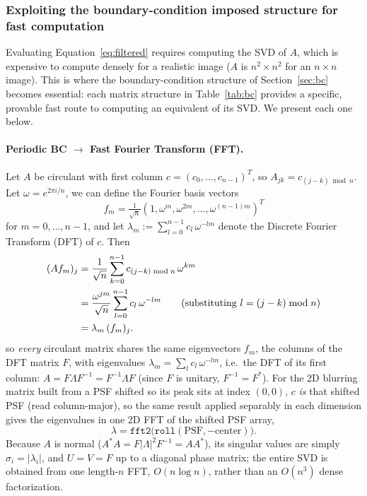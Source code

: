 \documentclass[12pt, a4paper, onecolumn]{article}
\theoremstyle{plain}          %
\theoremstyle{definition}     %
\theoremstyle{remark}
\begin{document}
\subsubsection{Exploiting the boundary-condition imposed structure for fast computation}
\label{sec:classical-fast}
Evaluating Equation~\eqref{eq:filtered} requires computing the SVD of $A$, which is expensive to compute densely for a realistic image ($A$ is
$n^2\times n^2$ for an $n\times n$ image). This is where the
boundary-condition structure of Section~\ref{sec:bc} becomes essential:
each matrix structure in Table~\ref{tab:bc} provides a specific, provable
fast route to computing an equivalent of its SVD. We present each one below.
 
\paragraph{Periodic BC $\to$ Fast Fourier Transform (FFT).} Let $A$ be circulant with first column
$c=(c_0,\dots,c_{n-1})^T$, so $A_{jk}=c_{(j-k)\bmod n}$. Let
$\omega=e^{2\pi i/n}$, we can define the Fourier basis vectors
$$f_m = \tfrac{1}{\sqrt n}(1,\omega^m,\omega^{2m},\dots,\omega^{(n-1)m})^T$$
for $m=0,\dots,n-1$, and let $\lambda_m := \sum_{l=0}^{n-1} c_l\,\omega^{-lm}$
denote the Discrete Fourier Transform (DFT) of $c$. Then
\begin{align}
    (Af_m)_j &= \frac{1}{\sqrt n}\sum_{k=0}^{n-1} c_{(j-k)\bmod n}\,\omega^{km} \notag\\
    &= \frac{\omega^{jm}}{\sqrt n}\sum_{l=0}^{n-1} c_l\,\omega^{-lm}
    \qquad\text{(substituting $l=(j-k)\bmod n$)} \notag\\
    &= \lambda_m\,(f_m)_j.
    \label{eq:circ-proof}
\end{align}
so \emph{every} circulant matrix shares the same eigenvectors $f_m$, the columns of the DFT matrix $F$, with eigenvalues
$\lambda_m=\sum_l c_l\,\omega^{-lm}$, i.e.\ the DFT of its first column:
$A=F\Lambda F^{-1}=F^{-1}\Lambda F$ (since $F$ is unitary, $F^{-1}=F^*$).
For the 2D blurring matrix built from a PSF shifted so its peak sits at
index $(0,0)$, $c$ \emph{is} that shifted PSF (read column-major), so the
same result applied separably in each dimension gives the eigenvalues in
one 2D FFT of the shifted PSF array,
\begin{equation}
    \lambda = \texttt{fft2}\big(\texttt{roll}(\text{PSF},-\text{center})\big).
    \label{eq:fft-eig}
\end{equation}
Because $A$ is normal ($A^*A=F|\Lambda|^2F^{-1}=AA^*$), its singular
values are simply $\sigma_i=|\lambda_i|$, and $U=V=F$ up to a diagonal
phase matrix; the entire SVD is obtained from one length-$n$ FFT,
$O(n\log n)$, rather than an $O(n^3)$ dense factorization.
 
\end{document}
